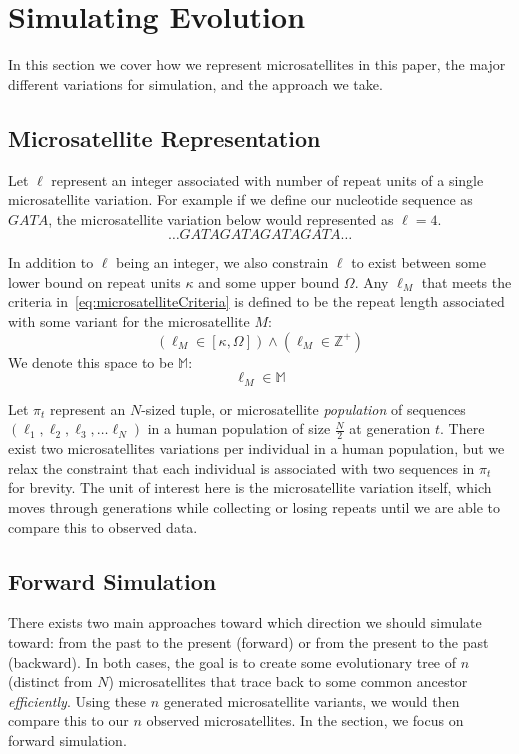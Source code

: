 \section{Simulating Evolution}\label{sec:se}
In this section we cover how we represent microsatellites in this paper, the major different variations for simulation,
and the approach we take.

\subsection{Microsatellite Representation}\label{subsec:mr}
Let $\ell$ represent an integer associated with number of repeat units of a single microsatellite variation.
For example if we define our nucleotide sequence as $GATA$, the microsatellite variation below would represented
as $\ell=4$.
\begin{equation*}
    \ldots \mathit{GATAGATAGATAGATA} \ldots
\end{equation*}

In addition to $\ell$ being an integer, we also constrain $\ell$ to exist between some lower bound on repeat units
$\kappa$ and some upper bound $\Omega$.
Any $\ell_M$ that meets the criteria in~\autoref{eq:microsatelliteCriteria} is defined to be the repeat length
associated with some variant for the microsatellite $M$:
\begin{equation}\label{eq:microsatelliteCriteria}
    \left(\ell_M \in [\kappa, \Omega]\right) \land \left(\ell_M \in \mathbb{Z}^+\right)
\end{equation}
We denote this space to be $\mathbb{M}$:
\begin{equation}
    \ell_M \in \mathbb{M}
\end{equation}

Let $\pi_t$ represent an $N$-sized tuple, or microsatellite \emph{population} of sequences
$\left(\ell_1, \ell_2, \ell_3, \ldots \ell_{N}\right)$ in a human population of size $\frac{N}{2}$ at generation $t$.
There exist two microsatellites variations per individual in a human population, but we relax the constraint that
each individual is associated with two sequences in $\pi_t$ for brevity.
The unit of interest here is the microsatellite variation itself, which moves through generations while collecting or
losing repeats until we are able to compare this to observed data.

\subsection{Forward Simulation}\label{subsec:fs}
There exists two main approaches toward which direction we should simulate toward: from the past to the present
(forward) or from the present to the past (backward).
In both cases, the goal is to create some evolutionary tree of $n$ (distinct from $N$) microsatellites that trace back
to some common ancestor \emph{efficiently}.
Using these $n$ generated microsatellite variants, we would then compare this to our $n$ observed microsatellites.
In the section, we focus on forward simulation.

